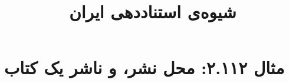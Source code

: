 \documentclass[a4paper,10pt]{article}
\begin{document}
\title{شیوه‌ی استناددهی ایران
 }
\author{}
\date{}
\maketitle



\section*{مثال ۲.۱۱۲: محل نشر، و ناشر یک کتاب}

\cite{دبیری1373}\\
\cite{wilson1992}\\






\end{document}
